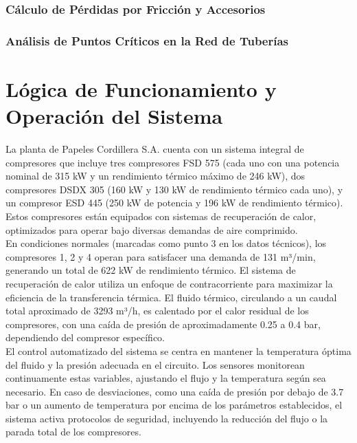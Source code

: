 \documentclass[11pt,a4paper]{article}  %
\begin{document}
\subsubsection{Cálculo de Pérdidas por Fricción y Accesorios}

\subsubsection{Análisis de Puntos Críticos en la Red de Tuberías}

\section{Lógica de Funcionamiento y Operación del Sistema}

La planta de Papeles Cordillera S.A. cuenta con un sistema integral de compresores que incluye tres compresores FSD 575 (cada uno con una potencia nominal de 315 kW y un rendimiento térmico máximo de 246 kW), dos compresores DSDX 305 (160 kW y 130 kW de rendimiento térmico cada uno), y un compresor ESD 445 (250 kW de potencia y 196 kW de rendimiento térmico). Estos compresores están equipados con sistemas de recuperación de calor, optimizados para operar bajo diversas demandas de aire comprimido.\\

En condiciones normales (marcadas como punto 3 en los datos técnicos), los compresores 1, 2 y 4 operan para satisfacer una demanda de 131 m³/min, generando un total de 622 kW de rendimiento térmico. El sistema de recuperación de calor utiliza un enfoque de contracorriente para maximizar la eficiencia de la transferencia térmica. El fluido térmico, circulando a un caudal total aproximado de 3293 m³/h, es calentado por el calor residual de los compresores, con una caída de presión de aproximadamente 0.25 a 0.4 bar, dependiendo del compresor específico.\\

El control automatizado del sistema se centra en mantener la temperatura óptima del fluido y la presión adecuada en el circuito. Los sensores monitorean continuamente estas variables, ajustando el flujo y la temperatura según sea necesario. En caso de desviaciones, como una caída de presión por debajo de 3.7 bar o un aumento de temperatura por encima de los parámetros establecidos, el sistema activa protocolos de seguridad, incluyendo la reducción del flujo o la parada total de los compresores.\\
\end{document}
